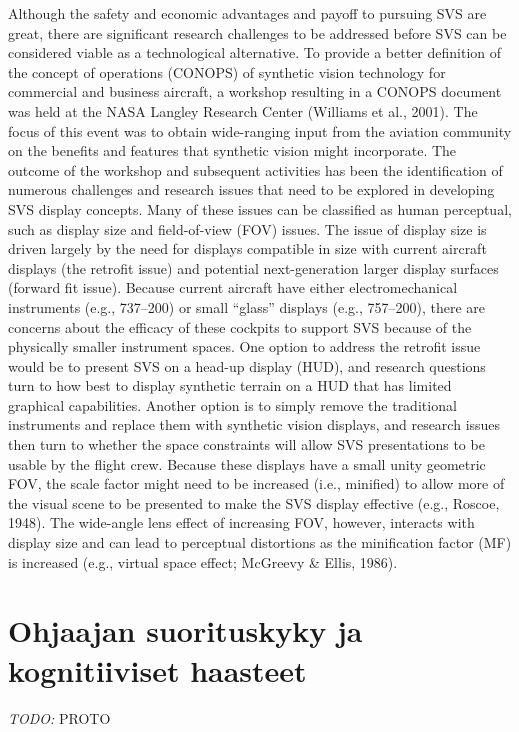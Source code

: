\documentclass[utf8,bachelor,manualbib]{gradu3}
\begin{document}
Although the safety and economic advantages and payoff to pursuing SVS are
great, there are significant research challenges to be addressed before SVS can be
considered viable as a technological alternative. To provide a better definition of
the concept of operations (CONOPS) of synthetic vision technology for commercial
and business aircraft, a workshop resulting in a CONOPS document was held
at the NASA Langley Research Center (Williams et al., 2001). The focus of this
event was to obtain wide-ranging input from the aviation community on the benefits
and features that synthetic vision might incorporate. The outcome of the workshop
and subsequent activities has been the identification of numerous challenges
and research issues that need to be explored in developing SVS display concepts.
Many of these issues can be classified as human perceptual, such as display size
and field-of-view (FOV) issues.
The issue of display size is driven largely by the need for displays compatible in
size with current aircraft displays (the retrofit issue) and potential next-generation
larger display surfaces (forward fit issue). Because current aircraft have either
electromechanical instruments (e.g., 737–200) or small “glass” displays (e.g.,
757–200), there are concerns about the efficacy of these cockpits to support SVS
because of the physically smaller instrument spaces. One option to address the retrofit
issue would be to present SVS on a head-up display (HUD), and research
questions turn to how best to display synthetic terrain on a HUD that has limited
graphical capabilities. Another option is to simply remove the traditional instruments
and replace them with synthetic vision displays, and research issues then
turn to whether the space constraints will allow SVS presentations to be usable by the flight crew. Because these displays have a small unity geometric FOV, the scale
factor might need to be increased (i.e., minified) to allow more of the visual scene
to be presented to make the SVS display effective (e.g., Roscoe, 1948). The
wide-angle lens effect of increasing FOV, however, interacts with display size and
can lead to perceptual distortions as the minification factor (MF) is increased (e.g.,
virtual space effect; McGreevy \& Ellis, 1986). \citep{prinzel2004}

\section{Ohjaajan suorituskyky ja kognitiiviset haasteet}

\emph{TODO:} PROTO 
\end{document}
